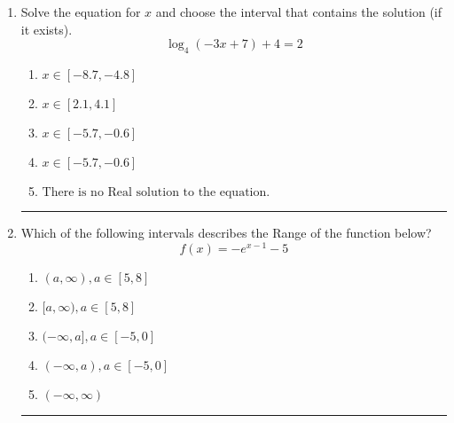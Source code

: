 \documentclass[14pt]{extbook}
\newcommand{\litem}[1]{\item#1\hspace*{-1cm}\rule{\textwidth}{0.4pt}}
\begin{document}
\begin{enumerate}
{\begin{enumerate}[label=\Alph*.]
\end{enumerate} }
\litem{
Solve the equation for $x$ and choose the interval that contains the solution (if it exists).\[ \log_{4}{(-3x+7)}+4 = 2 \]\begin{enumerate}[label=\Alph*.]
\item \( x \in [-8.7, -4.8] \)
\item \( x \in [2.1, 4.1] \)
\item \( x \in [-5.7, -0.6] \)
\item \( x \in [-5.7, -0.6] \)
\item \( \text{There is no Real solution to the equation.} \)

\end{enumerate} }
\litem{
Which of the following intervals describes the Range of the function below?\[ f(x) = -e^{x-1}-5 \]\begin{enumerate}[label=\Alph*.]
\item \( (a, \infty), a \in [5, 8] \)
\item \( [a, \infty), a \in [5, 8] \)
\item \( (-\infty, a], a \in [-5, 0] \)
\item \( (-\infty, a), a \in [-5, 0] \)
\item \( (-\infty, \infty) \)

\end{enumerate} }
\end{enumerate}
\end{document}
